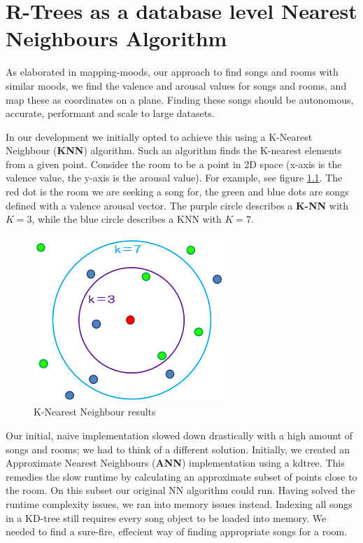 \chapter{R-Trees as a database level Nearest Neighbours Algorithm}
\label{appendix:rtree}

As elaborated in \refname{mapping-moods}, our approach to find songs and rooms with similar moods, we find the valence and arousal values for songs and rooms, and map these as coordinates on a plane.
Finding these songs should be autonomous, accurate,  performant and scale to large datasets. 

In our development we initially opted to achieve this using a K-Nearest Neighbour (\textbf{KNN}) algorithm.
Such an algorithm finds the K-nearest elements from a given point. 
Consider the room to be a point in 2D space (x-axis is the valence value, the y-axis is the arousal value).
For example, see figure \ref{fig:knn-image}. 
The red dot is the room we are seeking a song for, the green and blue dots are songs defined with a valence arousal vector. 
The purple circle describes a \textbf{K-NN} with $K = 3$, while the blue circle describes a KNN with $K = 7$. \\

\begin{figure}
  \centering
  \includegraphics[scale=0.6]{knearestneighboursexample.png}
  \caption{K-Nearest Neighbour results}
  \label{fig:knn-image}
\end{figure}

Our initial, naive implementation slowed down drastically with a high amount of songs and rooms;
we had to think of a different solution.
Initially, we created an Approximate Nearest Neighbours (\textbf{ANN}) implementation using a \gls{kdtree}.
This remedies the slow runtime by calculating an approximate subset of points close to the room.
On this subset our original NN algorithm could run.
Having solved the runtime complexity issues, we ran into memory issues instead.
Indexing all songs in a KD-tree still requires every song object to be loaded into memory.
We needed to find a sure-fire, effecient way of finding appropriate songs for a room.\\

